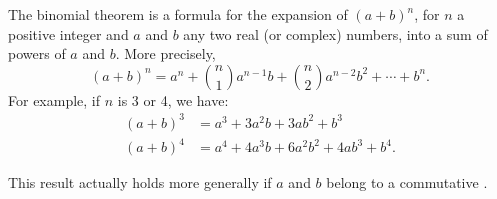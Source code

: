 \documentclass[12pt]{article}
\begin{document}
The binomial theorem is a formula for the expansion of $(a+b)^n$, for $n$ a positive integer and $a$ and $b$ any two real (or complex) numbers, into a sum of powers of $a$ and $b$. More precisely,
$$(a+b)^n  = a^n + \binom{n}{1} a^{n-1}b + \binom{n}{2} a^{n-2}b^2 + \cdots + b^n .
$$
For example, if $n$ is 3 or 4, we have:
\begin{eqnarray*}
(a+b)^3 &= a^3 + 3 a^2 b + 3 a b^2 + b^3 \\
(a+b)^4 &= a^4 + 4 a^3 b + 6 a^2 b^2 + 4 a b^3 + b^4 .
\end{eqnarray*}

This result actually holds more generally if $a$ and $b$ belong to a commutative .
\end{document}
